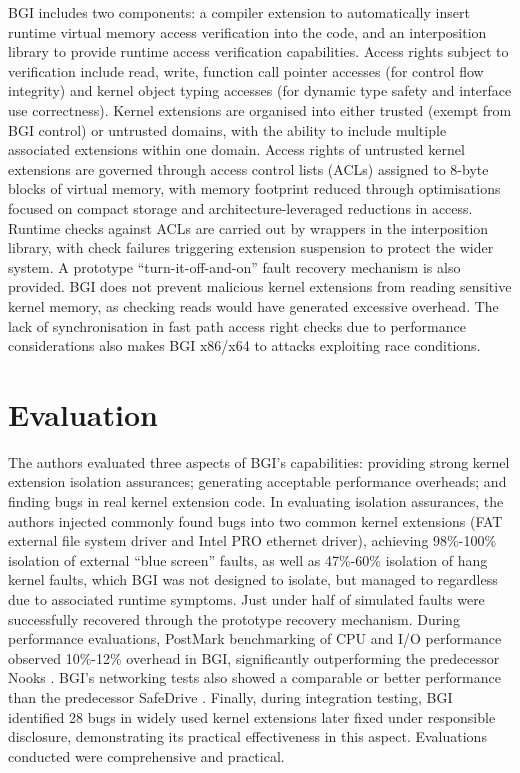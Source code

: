 \documentclass[11pt]{article}
\begin{document}
BGI includes two components: a compiler extension to automatically insert runtime virtual memory access verification into the code, and an interposition library to provide runtime access verification capabilities.  Access rights subject to verification include read, write, function call pointer accesses (for control flow integrity) and kernel object typing accesses (for dynamic type safety and interface use correctness).  Kernel extensions are organised into either trusted (exempt from BGI control) or untrusted domains, with the ability to include multiple associated extensions within one domain. Access rights of untrusted kernel extensions are governed through access control lists (ACLs) assigned to 8-byte blocks of virtual memory, with memory footprint reduced through optimisations focused on compact storage and architecture-leveraged reductions in access. Runtime checks against ACLs are carried out by wrappers in the interposition library, with check failures triggering extension suspension to protect the wider system. A prototype ``turn-it-off-and-on'' fault recovery mechanism is also provided. BGI does not prevent malicious kernel extensions from reading sensitive kernel memory, as checking reads would have generated excessive overhead. The lack of synchronisation in fast path access right checks due to performance considerations also makes BGI x86/x64 to attacks exploiting race conditions.

\section*{Evaluation}

The authors evaluated three aspects of BGI's capabilities: providing strong kernel extension isolation assurances; generating acceptable performance overheads; and finding bugs in real kernel extension code. In evaluating isolation assurances, the authors injected commonly found bugs into two common kernel extensions (FAT external file system driver and Intel PRO ethernet driver), achieving 98\%-100\% isolation of external ``blue screen'' faults, as well as 47\%-60\% isolation of hang kernel faults, which BGI was not designed to isolate, but managed to regardless due to associated runtime symptoms. Just under half of simulated faults were successfully recovered through the prototype recovery mechanism. During performance evaluations, PostMark benchmarking of CPU and I/O performance observed 10\%-12\% overhead in BGI, significantly outperforming the predecessor Nooks \cite{swift2003improving}. BGI's networking tests also showed a comparable or better performance than the predecessor SafeDrive \cite{zhou2006safedrive}. Finally, during integration testing, BGI identified 28 bugs in widely used kernel extensions later fixed under responsible disclosure, demonstrating its practical effectiveness in this aspect. Evaluations conducted were comprehensive and practical.
\end{document}
